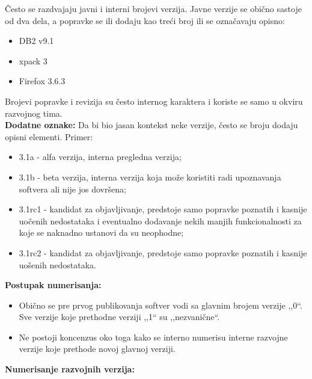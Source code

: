 \documentclass[a4paper]{article}
\begin{document}
  Često se razdvajaju javni i interni brojevi verzija. Javne verzije se obično sastoje od dva dela, 
  a popravke se ili dodaju kao treći broj ili se označavaju opisno:
  \begin{itemize}
    \item DB2 v9.1 
    \item xpack 3
    \item Firefox 3.6.3
  \end{itemize}
  Brojevi popravke i revizija su često internog karaktera i koriste se samo u okviru razvojnog tima.\\
  \textbf{Dodatne oznake:} Da bi bio jasan kontekst neke verzije, često se broju dodaju opisni 
  elementi. Primer:
  \begin{itemize}
    \item 3.1a - alfa verzija, interna pregledna verzija;
    \item 3.1b - beta verzija, interna verzija koja može koristiti radi upoznavanja softvera 
          ali nije jos dovršena;
    \item 3.1rc1 - kandidat za objavljivanje, predstoje samo popravke poznatih i 
          kasnije uočenih nedostataka i eventualno dodavanje nekih manjih funkcionalnosti 
          za koje se naknadno ustanovi da su neophodne;
    \item 3.1rc2 - kandidat za objavljivanje, predstoje samo popravke poznatih i 
          kasnije uošenih nedostataka.
  \end{itemize}
  \textbf{Postupak numerisanja:} 
  \begin{itemize}
    \item Obično se pre prvog publikovanja softver vodi sa glavnim brojem 
          verzije ,,0``. Sve verzije koje prethodne verziji ,,1`` su ,,nezvanične``. 
    \item Ne postoji koncenzus oko 
          toga kako se interno numerisu interne razvojne verzije koje prethode novoj 
          glavnoj verziji.
  \end{itemize}
  \textbf{Numerisanje razvojnih verzija:}
\end{document}
